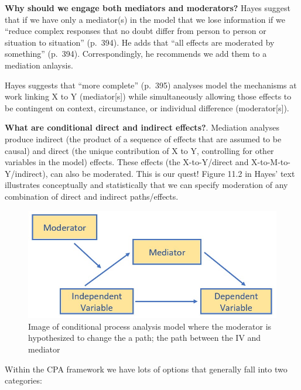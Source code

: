 \documentclass[
]{book}
\begin{document}
\textbf{Why should we engage both mediators and moderators?} Hayes \citeyearpar{hayes_introduction_2018} suggest that if we have only a mediator(s) in the model that we lose information if we ``reduce complex responses that no doubt differ from person to person or situation to situation'' (p.~394). He adds that ``all effects are moderated by something'' (p.~394). Correspondingly, he recommends we add them to a mediation anlaysis.

Hayes \citeyearpar{hayes_introduction_2018} suggests that ``more complete'' (p.~395) analyses model the mechanisms at work linking X to Y (mediator{[}s{]}) while simultaneously allowing those effects to be contingent on context, circumstance, or individual difference (moderator{[}s{]}).

\textbf{What are conditional direct and indirect effects?}. Mediation analyses produce indirect (the product of a sequence of effects that are assumed to be causal) and direct (the unique contribution of X to Y, controlling for other variables in the model) effects. These effects (the X-to-Y/direct and X-to-M-to-Y/indirect), can also be moderated. This is our quest! Figure 11.2 in Hayes' text \citeyearpar{hayes_introduction_2018} illustrates conceptually and statistically that we can specify moderation of any combination of direct and indirect paths/effects.

\begin{figure}
\centering
\includegraphics{images/SimpleMed/CPAmodel.jpg}
\caption{Image of conditional process analysis model where the moderator is hypothesized to change the a path; the path between the IV and mediator}
\end{figure}

Within the CPA framework we have lots of options that generally fall into two categories:
\end{document}
